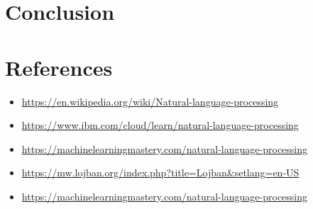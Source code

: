 \documentclass[11pt]{article}
\begin{document}
\clearpage









\section{Conclusion}
\label{sec:org0bf656b}

\section{References}
\label{sec:org221f73d}
\begin{itemize}
\item \url{https://en.wikipedia.org/wiki/Natural-language-processing}
\item \url{https://www.ibm.com/cloud/learn/natural-language-processing}
\item \url{https://machinelearningmastery.com/natural-language-processing}
\item \url{https://mw.lojban.org/index.php?title=Lojban\&setlang=en-US}
\item \url{https://machinelearningmastery.com/natural-language-processing}
\end{itemize}
\end{document}
